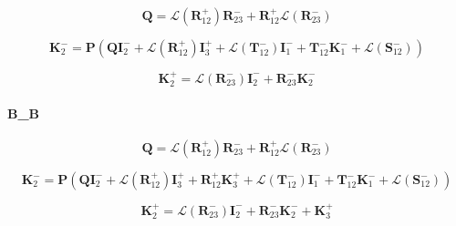 \begin{equation}
\mathbf{Q} = \mathcal{L}(\mathbf{R}^{+}_{12})\mathbf{R}^{-}_{23} + \mathbf{R}^{+}_{12}\mathcal{L}(\mathbf{R}^{-}_{23})
\label{eq:radiance-boa_radiance-tangent_linear-b_l_P}
\end{equation}

\begin{equation}
\mathbf{K}^{-}_{2} = \mathbf{P}(\mathbf{Q}\mathbf{I}^{-}_{2} + \mathcal{L}(\mathbf{R}^{+}_{12})\mathbf{I}^{+}_{3} + \mathcal{L}(\mathbf{T}^{-}_{12})\mathbf{I}^{-}_{1} + \mathbf{T}^{-}_{12}\mathbf{K}^{-}_{1} + \mathcal{L}(\mathbf{S}^{-}_{12}))
\label{eq:radiance-boa_radiance-tangent_linear-b_l_K_m_2}
\end{equation}

\begin{equation}
\mathbf{K}^{+}_{2} = \mathcal{L}(\mathbf{R}^{-}_{23})\mathbf{I}^{-}_{2} + \mathbf{R}^{-}_{23}\mathbf{K}^{-}_{2}
\label{eq:radiance-boa_radiance-tangent_linear-b_l_K_p_2}
\end{equation}


\paragraph{B\_B}
\label{sec:radiance-boa_radiance-tangent_linear-b_b}

\begin{equation}
\mathbf{Q} = \mathcal{L}(\mathbf{R}^{+}_{12})\mathbf{R}^{-}_{23} + \mathbf{R}^{+}_{12}\mathcal{L}(\mathbf{R}^{-}_{23})
\label{eq:radiance-boa_radiance-tangent_linear-b_b_P}
\end{equation}

\begin{equation}
\mathbf{K}^{-}_{2} = \mathbf{P}(\mathbf{Q}\mathbf{I}^{-}_{2} + \mathcal{L}(\mathbf{R}^{+}_{12})\mathbf{I}^{+}_{3} + \mathbf{R}^{+}_{12}\mathbf{K}^{+}_{3} + \mathcal{L}(\mathbf{T}^{-}_{12})\mathbf{I}^{-}_{1} + \mathbf{T}^{-}_{12}\mathbf{K}^{-}_{1} + \mathcal{L}(\mathbf{S}^{-}_{12}))
\label{eq:radiance-boa_radiance-tangent_linear-b_b_K_m_2}
\end{equation}

\begin{equation}
\mathbf{K}^{+}_{2} = \mathcal{L}(\mathbf{R}^{-}_{23})\mathbf{I}^{-}_{2} + \mathbf{R}^{-}_{23}\mathbf{K}^{-}_{2} + \mathbf{K}^{+}_{3}
\label{eq:radiance-boa_radiance-tangent_linear-b_b_K_p_2}
\end{equation}


%
